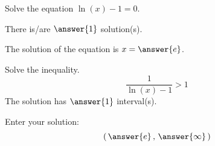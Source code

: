 \documentclass{ximera}
\author{Bobby Ramsey}
\begin{document}
\begin{exercise}
	Solve the equation $\ln(x) - 1 = 0$.

	There is/are $\answer{1}$ solution(s).
	\begin{exercise}
		The solution of the equation is $x = \answer{e}$.
	

		\begin{exercise}
			Solve the inequality.
			\[ \frac{1}{\ln(x)-1} > 1 \]
			The solution has $\answer{1}$ interval(s).
	
			\begin{exercise}
				Enter your solution:
				\[ \left( \, \answer{e} \, , \, \answer{\infty} \, \right) \]
			\end{exercise}
		\end{exercise}
	\end{exercise}
\end{exercise}
\end{document}
